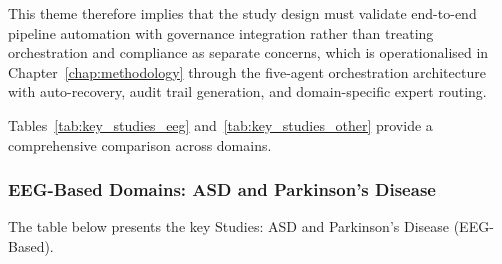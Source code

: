 \noindent This theme therefore implies that the study design must validate end-to-end pipeline automation with governance integration rather than treating orchestration and compliance as separate concerns, which is operationalised in Chapter~\ref{chap:methodology} through the five-agent orchestration architecture with auto-recovery, audit trail generation, and domain-specific expert routing.


\iffalse %
Tables~\ref{tab:key_studies_eeg} and~\ref{tab:key_studies_other} provide a comprehensive comparison across domains.

\subsubsection*{EEG-Based Domains: ASD and Parkinson's Disease}

\noindent The table below presents the key Studies: ASD and Parkinson's Disease (EEG-Based).


